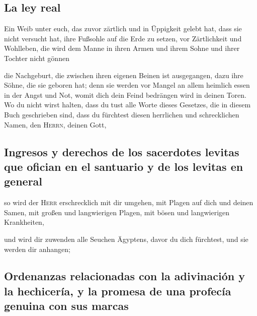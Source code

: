 \hypertarget{la-ley-real}{%
\subsection{La ley real}\label{la-ley-real}}

 Ein Weib unter euch, das zuvor zärtlich und in Üppigkeit
gelebt hat, dass sie nicht versucht hat, ihre Fußsohle auf die Erde zu
setzen, vor Zärtlichkeit und Wohlleben, die wird dem Manne in ihren
Armen und ihrem Sohne und ihrer Tochter nicht gönnen

 die Nachgeburt, die zwischen ihren eigenen Beinen ist
ausgegangen, dazu ihre Söhne, die sie geboren hat; denn sie werden vor
Mangel an allem heimlich essen in der Angst und Not, womit dich dein
Feind bedrängen wird in deinen Toren.  Wo du nicht wirst
halten, dass du tust alle Worte dieses Gesetzes, die in diesem Buch
geschrieben sind, dass du fürchtest diesen herrlichen und schrecklichen
Namen, den \textsc{Herrn}, deinen Gott,

\hypertarget{ingresos-y-derechos-de-los-sacerdotes-levitas-que-ofician-en-el-santuario-y-de-los-levitas-en-general}{%
\subsection{Ingresos y derechos de los sacerdotes levitas que ofician en
el santuario y de los levitas en
general}\label{ingresos-y-derechos-de-los-sacerdotes-levitas-que-ofician-en-el-santuario-y-de-los-levitas-en-general}}

 so wird der \textsc{Herr} erschrecklich mit dir umgehen,
mit Plagen auf dich und deinen Samen, mit großen und langwierigen
Plagen, mit bösen und langwierigen Krankheiten,

 und wird dir zuwenden alle Seuchen Ägyptens, davor du
dich fürchtest, und sie werden dir anhangen;

\hypertarget{ordenanzas-relacionadas-con-la-adivinaciuxf3n-y-la-hechiceruxeda-y-la-promesa-de-una-profecuxeda-genuina-con-sus-marcas}{%
\subsection{Ordenanzas relacionadas con la adivinación y la hechicería,
y la promesa de una profecía genuina con sus
marcas}\label{ordenanzas-relacionadas-con-la-adivinaciuxf3n-y-la-hechiceruxeda-y-la-promesa-de-una-profecuxeda-genuina-con-sus-marcas}}

